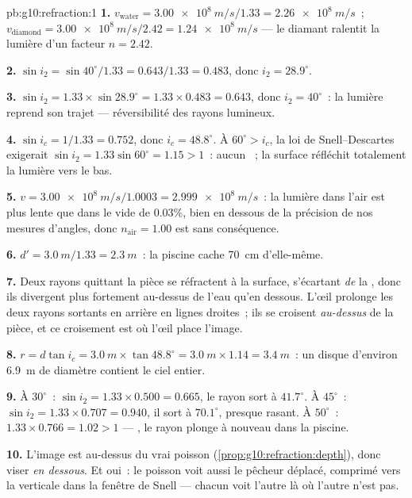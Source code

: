 \begin{solution}{pb:g10:refraction:1}
\textbf{1.} $v_{\text{water}} = \qty{3.00e8}{m/s}/1.33 =
\qty{2.26e8}{m/s}$~; $v_{\text{diamond}} = \qty{3.00e8}{m/s}/2.42 =
\qty{1.24e8}{m/s}$ --- le diamant ralentit la lumière d'un facteur
$n = 2.42$.

\textbf{2.} $\sin i_2 = \sin 40^\circ / 1.33 = 0.643/1.33 = 0.483$,
donc $i_2 = 28.9^\circ$.

\textbf{3.} $\sin i_2 = 1.33 \times \sin 28.9^\circ = 1.33 \times
0.483 = 0.643$, donc $i_2 = 40^\circ$~: la lumière reprend son
trajet --- réversibilité des rayons lumineux.

\textbf{4.} $\sin i_c = 1/1.33 = 0.752$, donc $i_c = 48.8^\circ$. À
$60^\circ > i_c$, la loi de Snell--Descartes exigerait
$\sin i_2 = 1.33 \sin 60^\circ = 1.15 > 1$~: aucun
~; la surface réfléchit totalement la lumière
vers le bas.

\textbf{5.} $v = \qty{3.00e8}{m/s}/1.0003 = \qty{2.999e8}{m/s}$~: la
lumière dans l'air est plus lente que dans le vide de $0.03\%$, bien
en dessous de la précision de nos mesures d'angles, donc
$n_{\text{air}} = 1.00$ est sans conséquence.

\textbf{6.} $d' = \qty{3.0}{m}/1.33 = \qty{2.3}{m}$~: la piscine cache
\qty{70}{cm} d'elle-même.

\textbf{7.} Deux rayons quittant la pièce se réfractent à la surface,
s'écartant \emph{de} la , donc ils divergent plus
fortement au-dessus de l'eau qu'en dessous. L'œil prolonge les deux
rayons sortants en arrière en lignes droites~; ils se croisent
\emph{au-dessus} de la pièce, et ce croisement est où l'œil place
l'image.

\textbf{8.} $r = d \tan i_c = \qty{3.0}{m} \times \tan 48.8^\circ =
\qty{3.0}{m} \times 1.14 = \qty{3.4}{m}$~: un disque d'environ
\qty{6.9}{m} de diamètre contient le ciel entier.

\textbf{9.} À $30^\circ$~: $\sin i_2 = 1.33 \times 0.500 = 0.665$, le
rayon sort à $41.7^\circ$. À $45^\circ$~: $\sin i_2 = 1.33 \times
0.707 = 0.940$, il sort à $70.1^\circ$, presque rasant. À
$50^\circ$~: $1.33 \times 0.766 = 1.02 > 1$ --- , le rayon plonge à nouveau dans la piscine.

\textbf{10.} L'image est au-dessus du vrai poisson
(\cref{prop:g10:refraction:depth}), donc viser \emph{en dessous}. Et
oui~: le poisson voit aussi le pêcheur déplacé, comprimé vers la
verticale dans la fenêtre de Snell --- chacun voit l'autre là où
l'autre n'est pas.


\end{solution}
